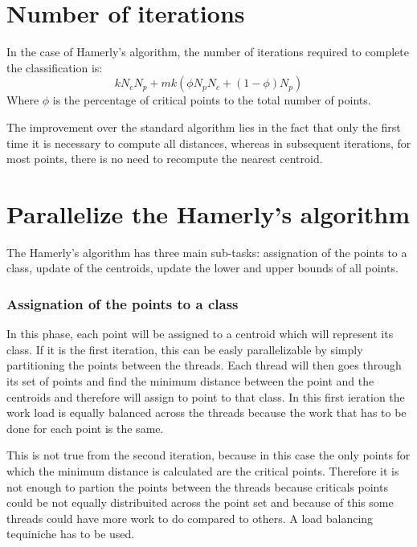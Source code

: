 \documentclass{report}
\begin{document}
\begin{minipage}[b]{0.48\textwidth}
  \section*{Number of iterations}
  In the case of Hamerly's algorithm, the number of iterations required to complete the classification is:
  \begin{equation}
      kN_cN_p + mk(\phi N_pN_c + (1 - \phi)N_p)
  \end{equation}
  Where $\phi$ is the percentage of critical points to the total number of points.

  The improvement over the standard algorithm lies in the fact that only the first time it is necessary to compute all distances, whereas in subsequent iterations, for most points, there is no need to recompute the nearest centroid.

  \section*{Parallelize the Hamerly's algorithm}
  The Hamerly's algorithm has three main sub-tasks: assignation of the points to a class, update of the centroids, update the lower and upper bounds of all points.

  \subsubsection*{Assignation of the points to a class}
  In this phase, each point will be assigned to a centroid which will represent its class. If it is the first iteration, this can be easly parallelizable by simply partitioning the points between the threads. Each thread will then goes through its set of points and find the minimum distance between the point and the centroids and therefore will assign to point to that class. In this first ieration the work load is equally balanced across the threads because the work that has to be done for each point is the same.

  This is not true from the second iteration, because in this case the only points for which the minimum distance is calculated are the critical points. Therefore it is not enough to partion the points between the threads because criticals points could be not equally distribuited across the point set and because of this some threads could have more work to do compared to others. A load balancing tequiniche has to be used.


\end{minipage}
\end{document}
